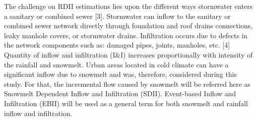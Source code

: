 The challenge on RDII estimations lies upon the different ways stormwater enters a sanitary or combined sewer [3]. Stormwater can inflow to the sanitary or combined sewer network directly through foundation and roof drains connections, leaky manhole covers, or stormwater drains.  Infiltration occurs due to defects in the network components such as: damaged pipes, joints, manholes, etc. [4]
Quantity of inflow and infiltration (I&I) increases proportionally with intensity of the rainfall and snowmelt. Urban areas located in cold climate can have a significant inflow due to snowmelt and was, therefore, considered during this study. For that, the incremental flow caused by snowmelt will be referred here as Snowmelt Dependent Inflow and Infiltration (SDII). Event-based Inflow and Infiltration (EBII) will be used as a general term for both snowmelt and rainfall inflow and infiltration.
